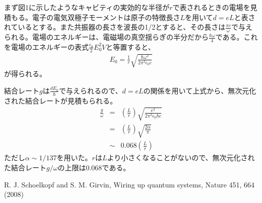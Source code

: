 \documentclass[11pt,a4paper]{jsarticle}
\begin{document}
まず図1に示したようなキャビティの実効的な半径が$r$で表されるときの電場を見積もる。電子の電気双極子モーメントは原子の特徴長さ$L$を用いて$d=eL$と表されているとする。また共振器の長さを波長の1/2とすると、その長さは$\frac{\pi c}{\omega}$で与えられる。電場のエネルギーは、電磁場の真空揺らぎの半分だから$\frac{\hbar \omega}{4}$である。これを電場のエネルギーの表式$\frac{\epsilon_0}{2}E_0^2 V$と等置すると、
\begin{eqnarray}
E_0 = \frac{1}{r} \sqrt{\frac{\hbar \omega^2}{2\pi^2 \epsilon_0 c} }
\end{eqnarray}
が得られる。

結合レート$g$は$\frac{dE_0}{\hbar}$で与えられるので、$d=eL$の関係を用いて上式から、無次元化された結合レートが見積もられる。
\begin{eqnarray}
\frac{g}{\omega} &=& (\frac{L}{r}) \sqrt{\frac{e^2}{2\pi^2 \epsilon_0 \hbar c} }\\
&=& (\frac{L}{r}) \sqrt{\frac{2\alpha}{\pi} }\\
&\sim& 0.068 (\frac{L}{r} )
\end{eqnarray}
ただし$\alpha\sim1/137$を用いた。$r$は$L$より小さくなることがないので、無次元化された結合レート$g/\omega$の上限は0.068である。


\begin{thebibliography}{9}
 R. J. Schoelkopf and S. M. Girvin, Wiring up quantum systems, Nature 451, 664 (2008)
\end{thebibliography}
\end{document}
